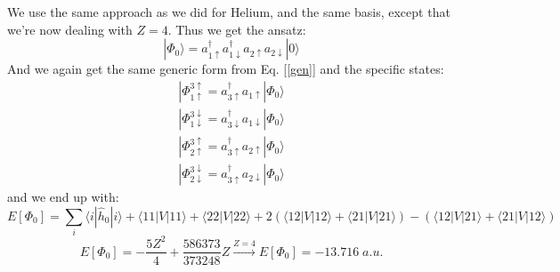 \documentclass{article}
\begin{document}
\section{}
We use the same approach as we did for Helium, and the same basis, except that we're now dealing with $Z=4$. Thus we get the ansatz:
\begin{equation}
    |\Phi_0\rangle = a_{1\uparrow}^\dagger a_{1\downarrow}^\dagger a_{2\uparrow}a_{2\downarrow}|0\rangle
\end{equation}
And we again get the same generic form from Eq. [\ref{gen}] and the specific states:
\begin{gather*}
    |\Phi_{1\uparrow}^{3\uparrow} = a_{3\uparrow}^\dagger a_{1\uparrow} |\Phi_0 \rangle \\
    |\Phi_{1\downarrow}^{3\downarrow} = a_{3\downarrow}^\dagger a_{1\downarrow} |\Phi_0 \rangle \\
    |\Phi_{2\uparrow}^{3\uparrow} = a_{3\uparrow}^\dagger a_{2\uparrow} |\Phi_0 \rangle \\
    |\Phi_{2\downarrow}^{3\downarrow} = a_{3\uparrow}^\dagger a_{2\downarrow} |\Phi_0 \rangle
\end{gather*}
and we end up with:
\begin{equation*}
    E[\Phi_0] = \sum_i \langle i | \hat h_0 | i \rangle + \langle 11 | V | 11 \rangle + \langle 22 | V | 22 \rangle + 2\left(\langle 12 | V | 12 \rangle + \langle 21 | V | 21 \rangle\right) - \left(\langle 12|V|21\rangle + \langle 21|V| 12 \rangle \right)
\end{equation*}
\begin{equation}
    E[\Phi_0] = - \frac{5Z^2}{4} + \frac{586373}{373248}Z \xrightarrow[]{Z = 4} E\left[\Phi_0 \right] = -13.716 \; a.u.
\end{equation}
\end{document}
